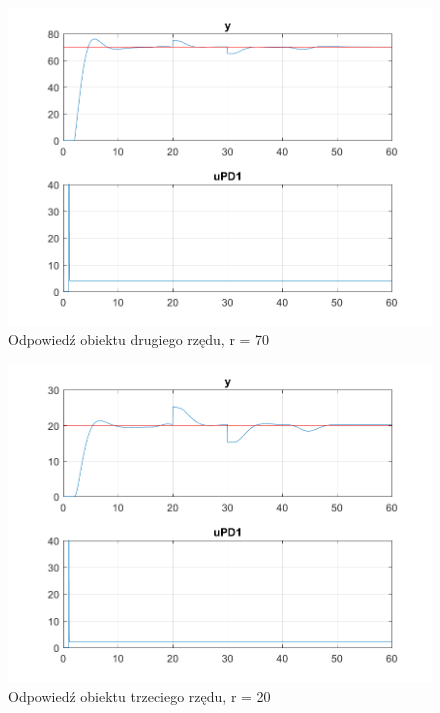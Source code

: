 \begin{figure}[h!]
	\centering
	\includegraphics[scale = 0.8]{fig/Z1_New_Signal_1/fig1_2_70.png}
	\caption		
	{Odpowiedź obiektu drugiego rzędu, r = 70}
	\label{wykres_2}
\end{figure} 

\begin{figure}[h!]
	\centering
	\includegraphics[scale = 0.8]{fig/Z1_New_Signal_1/fig1_3_20.png}
	\caption		
	{Odpowiedź obiektu trzeciego rzędu, r = 20}
	\label{wykres_3}
\end{figure} 


